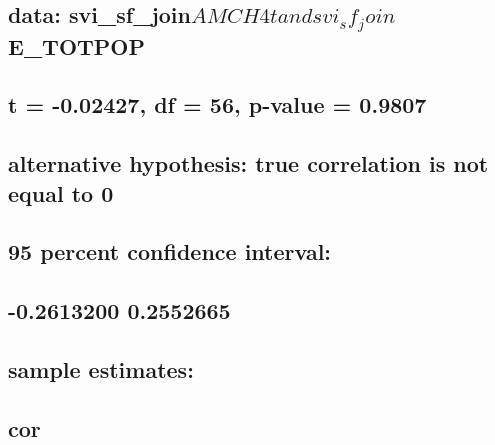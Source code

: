 \documentclass[
  12pt,
]{article}
\begin{document}
\hypertarget{section-21}{%
\subsection{}\label{section-21}}

\hypertarget{data-svi_sf_joinamch4t-and-svi_sf_joine_totpop}{%
\subsection{\texorpdfstring{data:
svi\_sf\_join\(AMCH4t and svi_sf_join\)E\_TOTPOP}{data: svi\_sf\_joinAMCH4t and svi\_sf\_joinE\_TOTPOP}}\label{data-svi_sf_joinamch4t-and-svi_sf_joine_totpop}}

\hypertarget{t--0.02427-df-56-p-value-0.9807}{%
\subsection{t = -0.02427, df = 56, p-value =
0.9807}\label{t--0.02427-df-56-p-value-0.9807}}

\hypertarget{alternative-hypothesis-true-correlation-is-not-equal-to-0-2}{%
\subsection{alternative hypothesis: true correlation is not equal to
0}\label{alternative-hypothesis-true-correlation-is-not-equal-to-0-2}}

\hypertarget{percent-confidence-interval-2}{%
\subsection{95 percent confidence
interval:}\label{percent-confidence-interval-2}}

\hypertarget{section-22}{%
\subsection{-0.2613200 0.2552665}\label{section-22}}

\hypertarget{sample-estimates-2}{%
\subsection{sample estimates:}\label{sample-estimates-2}}

\hypertarget{cor-2}{%
\subsection{cor}\label{cor-2}}
\end{document}
